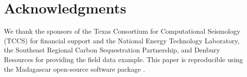 \section{Acknowledgments}
We thank the sponsors of the Texas Consortium for Computational Seismology (TCCS) for financial support and the National Energy Technology Laboratory, the Southeast Regional Carbon Sequestration Partnership, and Denbury Resources for providing the field data example.
This paper is reproducible using the Madagascar open-source software package \cite[]{fomel13}.

\onecolumn


